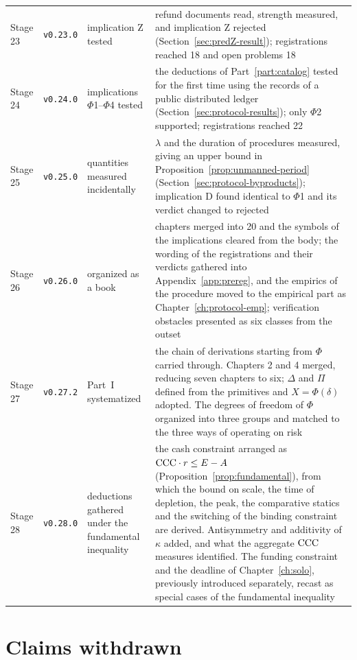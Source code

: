 \begin{longtable}{@{}ll>{\raggedright\arraybackslash}p{}>{\raggedright\arraybackslash}p{}@{}}
Stage 23 & \texttt{v0.23.0} & implication Z tested & 907 refund documents read, strength measured, and implication Z rejected (Section~\ref{sec:predZ-result}); registrations reached 18 and open problems 18 \\
Stage 24 & \texttt{v0.24.0} & implications $\Phi$1--$\Phi$4 tested & the deductions of Part~\ref{part:catalog} tested for the first time using the records of a public distributed ledger (Section~\ref{sec:protocol-results}); only $\Phi$2 supported; registrations reached 22 \\
Stage 25 & \texttt{v0.25.0} & quantities measured incidentally & $\lambda$ and the duration of procedures measured, giving an upper bound in Proposition~\ref{prop:unmanned-period} (Section~\ref{sec:protocol-byproducts}); implication D found identical to $\Phi$1 and its verdict changed to rejected \\
Stage 26 & \texttt{v0.26.0} & organized as a book & 22 chapters merged into 20 and the symbols of the implications cleared from the body; the wording of the registrations and their verdicts gathered into Appendix~\ref{app:prereg}, and the empirics of the procedure moved to the empirical part as Chapter~\ref{ch:protocol-emp}; verification obstacles presented as six classes from the outset \\
Stage 27 & \texttt{v0.27.2} & Part~I systematized & the chain of derivations starting from $\Phi$ carried through. Chapters 2 and 4 merged, reducing seven chapters to six; $\Delta$ and $\Pi$ defined from the primitives and $X=\Phi(\delta)$ adopted. The degrees of freedom of $\Phi$ organized into three groups and matched to the three ways of operating on risk \\
Stage 28 & \texttt{v0.28.0} & deductions gathered under the fundamental inequality & the cash constraint arranged as $\mathrm{CCC}\cdot r\leq E-A$ (Proposition~\ref{prop:fundamental}), from which the bound on scale, the time of depletion, the peak, the comparative statics and the switching of the binding constraint are derived. Antisymmetry and additivity of $\kappa$ added, and what the aggregate $\mathrm{CCC}$ measures identified. The funding constraint and the deadline of Chapter~\ref{ch:solo}, previously introduced separately, recast as special cases of the fundamental inequality \\
\end{longtable}


\section{Claims withdrawn}


